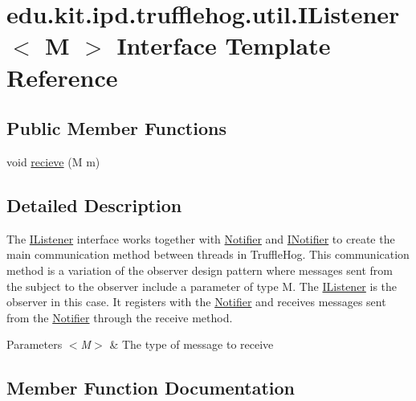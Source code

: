 \hypertarget{interfaceedu_1_1kit_1_1ipd_1_1trufflehog_1_1util_1_1_i_listener}{}\section{edu.\+kit.\+ipd.\+trufflehog.\+util.\+I\+Listener$<$ M $>$ Interface Template Reference}
\label{interfaceedu_1_1kit_1_1ipd_1_1trufflehog_1_1util_1_1_i_listener}
\subsection*{Public Member Functions}
\begin{DoxyCompactItemize}
\item 
void \hyperlink{interfaceedu_1_1kit_1_1ipd_1_1trufflehog_1_1util_1_1_i_listener_add1bd1b7ef9f43792286f25ec6639327}{recieve} (M m)
\end{DoxyCompactItemize}


\subsection{Detailed Description}
The \hyperlink{interfaceedu_1_1kit_1_1ipd_1_1trufflehog_1_1util_1_1_i_listener}{I\+Listener} interface works together with \hyperlink{classedu_1_1kit_1_1ipd_1_1trufflehog_1_1util_1_1_notifier}{Notifier} and \hyperlink{interfaceedu_1_1kit_1_1ipd_1_1trufflehog_1_1util_1_1_i_notifier}{I\+Notifier} to create the main communication method between threads in Truffle\+Hog. This communication method is a variation of the observer design pattern where messages sent from the subject to the observer include a parameter of type M. The \hyperlink{interfaceedu_1_1kit_1_1ipd_1_1trufflehog_1_1util_1_1_i_listener}{I\+Listener} is the observer in this case. It registers with the \hyperlink{classedu_1_1kit_1_1ipd_1_1trufflehog_1_1util_1_1_notifier}{Notifier} and receives messages sent from the \hyperlink{classedu_1_1kit_1_1ipd_1_1trufflehog_1_1util_1_1_notifier}{Notifier} through the receive method. 


\begin{DoxyParams}{Parameters}
{\em $<$\+M$>$} & The type of message to receive \\
\hline
\end{DoxyParams}


\subsection{Member Function Documentation}
\hypertarget{interfaceedu_1_1kit_1_1ipd_1_1trufflehog_1_1util_1_1_i_listener_add1bd1b7ef9f43792286f25ec6639327}{}
